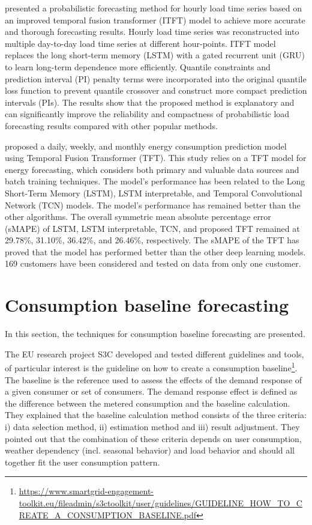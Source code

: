 \cite{LI2023108743} presented a probabilistic forecasting method for hourly load time series based on an improved temporal fusion transformer (ITFT) model to achieve more accurate and thorough forecasting results.
Hourly load time series was reconstructed into multiple day-to-day load time series at different hour-points.
ITFT model replaces the long short-term memory (LSTM) with a gated recurrent unit (GRU) to learn long-term dependence more efficiently.
Quantile constraints and prediction interval (PI) penalty terms were incorporated into the original quantile loss function to prevent quantile crossover and construct more compact prediction intervals (PIs).
The results show that the proposed method is explanatory and can significantly improve the reliability and compactness of probabilistic load forecasting results compared with other popular methods.

\cite{NAZIR2023100888} proposed a daily, weekly, and monthly energy consumption prediction model using Temporal Fusion Transformer (TFT).
This study relies on a TFT model for energy forecasting, which considers both primary and valuable data sources and batch training techniques.
The model’s performance has been related to the Long Short-Term Memory (LSTM), LSTM interpretable, and Temporal Convolutional Network (TCN) models.
The model’s performance has remained better than the other algorithms.
The overall symmetric mean absolute percentage error (sMAPE) of LSTM, LSTM interpretable, TCN, and proposed TFT remained at 29.78\%, 31.10\%, 36.42\%, and 26.46\%, respectively.
The sMAPE of the TFT has proved that the model has performed better than the other deep learning models.
169 customers have been considered and tested on data from only one customer.


\section{Consumption baseline forecasting}
\label{sec:baselinesoa}
\vspace{0.2 cm}

In this section, the techniques for consumption baseline forecasting are presented.

The EU research project S3C developed and tested different guidelines and tools, of particular interest is the guideline on how to create a consumption baseline\footnote{ \url{https://www.smartgrid-engagement-toolkit.eu/fileadmin/s3ctoolkit/user/guidelines/GUIDELINE_HOW_TO_CREATE_A_CONSUMPTION_BASELINE.pdf} }.
The baseline is the reference used to assess the effects of the demand response of a given consumer or set of consumers.
The demand response effect is defined as the difference between the metered consumption and the baseline calculation.
They explained that the baseline calculation method consists of the three criteria:
i) data selection method,
ii) estimation method
and iii) result adjustment.
They pointed out that the combination of these criteria depends on user consumption, weather dependency (incl. seasonal behavior) and load behavior and should all together fit the user consumption pattern.


